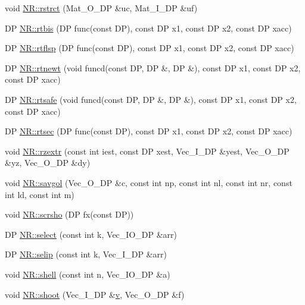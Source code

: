 \begin{DoxyCompactItemize}
\item 
void \mbox{\hyperlink{namespaceNR_aca06dba4235f41d5484914650537c0a3}{N\+R\+::rstrct}} (Mat\+\_\+\+O\+\_\+\+DP \&uc, Mat\+\_\+\+I\+\_\+\+DP \&uf)
\item 
DP \mbox{\hyperlink{namespaceNR_a0ecfb6285a930173efe5515a12567cd4}{N\+R\+::rtbis}} (DP func(const DP), const DP x1, const DP x2, const DP xacc)
\item 
DP \mbox{\hyperlink{namespaceNR_ab4085cd59aa4773f48fe033fb6be4418}{N\+R\+::rtflsp}} (DP func(const DP), const DP x1, const DP x2, const DP xacc)
\item 
DP \mbox{\hyperlink{namespaceNR_ae880eed2f01cf2dd35a36515f9ec1f8b}{N\+R\+::rtnewt}} (void funcd(const DP, DP \&, DP \&), const DP x1, const DP x2, const DP xacc)
\item 
DP \mbox{\hyperlink{namespaceNR_a37b63f41a0f8b8da8b68076cfa194a1f}{N\+R\+::rtsafe}} (void funcd(const DP, DP \&, DP \&), const DP x1, const DP x2, const DP xacc)
\item 
DP \mbox{\hyperlink{namespaceNR_a605de556663dbd83b38d1ca358125af1}{N\+R\+::rtsec}} (DP func(const DP), const DP x1, const DP x2, const DP xacc)
\item 
void \mbox{\hyperlink{namespaceNR_a17af9084521630603977a8c9bd46bd40}{N\+R\+::rzextr}} (const int iest, const DP xest, Vec\+\_\+\+I\+\_\+\+DP \&yest, Vec\+\_\+\+O\+\_\+\+DP \&yz, Vec\+\_\+\+O\+\_\+\+DP \&dy)
\item 
void \mbox{\hyperlink{namespaceNR_a8c8d71cc60561155b11e42e028ee3b8c}{N\+R\+::savgol}} (Vec\+\_\+\+O\+\_\+\+DP \&c, const int np, const int nl, const int nr, const int ld, const int m)
\item 
void \mbox{\hyperlink{namespaceNR_adc488f409f614650e59bd201350349ee}{N\+R\+::scrsho}} (DP fx(const DP))
\item 
DP \mbox{\hyperlink{namespaceNR_a0717290c06f42aa15e83108843ebe8e9}{N\+R\+::select}} (const int k, Vec\+\_\+\+I\+O\+\_\+\+DP \&arr)
\item 
DP \mbox{\hyperlink{namespaceNR_a9c893dc4317a41c90e5275f875f49514}{N\+R\+::selip}} (const int k, Vec\+\_\+\+I\+\_\+\+DP \&arr)
\item 
void \mbox{\hyperlink{namespaceNR_a64047fe43a54a8a00d0311739cf7d0d2}{N\+R\+::shell}} (const int n, Vec\+\_\+\+I\+O\+\_\+\+DP \&a)
\item 
void \mbox{\hyperlink{namespaceNR_a3a4867f05151e5dd8b231be47dbd5523}{N\+R\+::shoot}} (Vec\+\_\+\+I\+\_\+\+DP \&\mbox{\hyperlink{adat__devel_2lib_2hadron_2hadron__timeslice_8cc_a716fc87f5e814be3ceee2405ed6ff22a}{v}}, Vec\+\_\+\+O\+\_\+\+DP \&f)

\end{DoxyCompactItemize}
